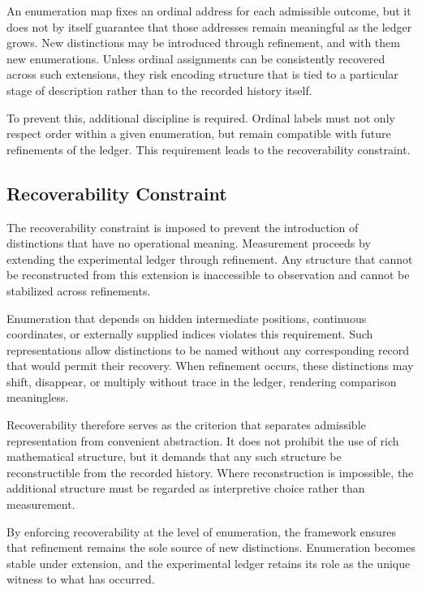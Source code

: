 An enumeration map fixes an ordinal address for each admissible outcome, but it
does not by itself guarantee that those addresses remain meaningful as the
ledger grows. New distinctions may be introduced through refinement, and with
them new enumerations. Unless ordinal assignments can be consistently recovered
across such extensions, they risk encoding structure that is tied to a
particular stage of description rather than to the recorded history itself.

To prevent this, additional discipline is required. Ordinal labels must not only
respect order within a given enumeration, but remain compatible with future
refinements of the ledger. This requirement leads to the recoverability
constraint.




\subsection{Recoverability Constraint}

The recoverability constraint is imposed to prevent the introduction of
distinctions that have no operational meaning.  Measurement proceeds by
extending the experimental ledger through refinement.  Any structure that
cannot be reconstructed from this extension is inaccessible to observation and
cannot be stabilized across refinements.

Enumeration that depends on hidden intermediate positions, continuous
coordinates, or externally supplied indices violates this requirement.  Such
representations allow distinctions to be named without any corresponding record
that would permit their recovery.  When refinement occurs, these distinctions
may shift, disappear, or multiply without trace in the ledger, rendering
comparison meaningless.

Recoverability therefore serves as the criterion that separates admissible
representation from convenient abstraction.  It does not prohibit the use of
rich mathematical structure, but it demands that any such structure be
reconstructible from the recorded history.  Where reconstruction is impossible,
the additional structure must be regarded as interpretive choice rather than
measurement.

By enforcing recoverability at the level of enumeration, the framework ensures
that refinement remains the sole source of new distinctions.  Enumeration
becomes stable under extension, and the experimental ledger retains its role as
the unique witness to what has occurred.


